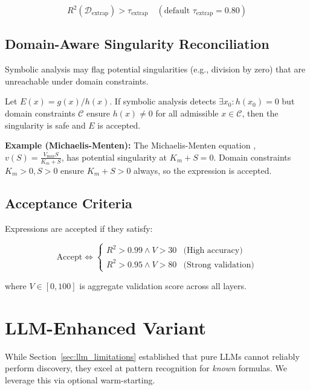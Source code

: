 \documentclass[twoside,11pt]{article}
\begin{document}
\begin{equation}
R^2(\mathcal{D}_{\text{extrap}}) > \tau_{\text{extrap}} \quad (\text{default } \tau_{\text{extrap}} = 0.80)
\end{equation}

\subsection{Domain-Aware Singularity Reconciliation}

Symbolic analysis may flag potential singularities (e.g., division by zero) that are unreachable under domain constraints.

\begin{proposition}
\label{prop:safe_singularity}
Let $E(x) = g(x)/h(x)$. If symbolic analysis detects $\exists x_0: h(x_0) = 0$ but domain constraints $\mathcal{C}$ ensure $h(x) \neq 0$ for all admissible $x \in \mathcal{C}$, then the singularity is safe and $E$ is accepted.
\end{proposition}

\textbf{Example (Michaelis-Menten):} The Michaelis-Menten equation \citep{michaelis1913kinetics}, $v(S) = \frac{V_{\max}S}{K_m + S}$, has potential singularity at $K_m + S = 0$. Domain constraints $K_m > 0, S > 0$ ensure $K_m + S > 0$ always, so the expression is accepted.

\subsection{Acceptance Criteria}

Expressions are accepted if they satisfy:

\begin{equation}
\text{Accept} \iff \begin{cases}
R^2 > 0.99 \land V > 30 & \text{(High accuracy)} \\
R^2 > 0.95 \land V > 80 & \text{(Strong validation)}
\end{cases}
\end{equation}

where $V \in [0, 100]$ is aggregate validation score across all layers.

\section{LLM-Enhanced Variant}
\label{sec:llm_enhancement}

While Section~\ref{sec:llm_limitations} established that pure LLMs cannot reliably perform discovery, they excel at pattern recognition for \emph{known} formulas. We leverage this via optional warm-starting.
\end{document}
